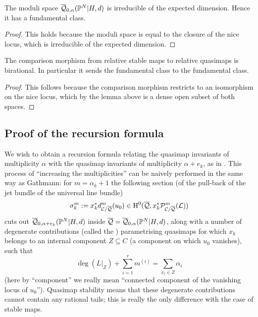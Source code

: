 \begin{cor} The moduli space $\overline{\mathcal Q}_{0,\alpha}(\mathbb P^N|H,d)$ is irreducible of the expected dimension. Hence it has a fundamental class. \end{cor}
\begin{proof} This holds because the moduli space is equal to the closure of the nice locus, which is irreducible of the expected dimension. \end{proof}

\begin{cor} \label{Comparison morphism birational} The comparison morphism from relative stable maps to relative quasimaps is birational. In particular it sends the fundamental class to the fundamental class. \end{cor}
\begin{proof} This follows because the comparison morphism restricts to an isomorphism on the nice locus, which by the lemma above is a dense open subset of both spaces. \end{proof}


\subsection{Proof of the recursion formula} \label{Subsection recursion formula for PN}
We wish to obtain a recursion formula relating the quasimap invariants of multiplicity $\alpha$ with the quasimap invariants of multiplicity $\alpha + e_k$, as in \cite[Theorem 2.6]{Ga}. This process of ``increasing the multiplicities'' can be naively performed in the same way as Gathmann: for $m = \alpha_k + 1$ the following section (of the pull-back of the jet bundle of the universal line bundle)
\[
\sigma^m_k := x_k^*d^m_{\mathcal C/\overline{\mathcal{Q}}}(u_0)\in \operatorname{H}^0(\overline{\mathcal{Q}},x_k^*\mathcal P^m_{\mathcal C/\overline{\mathcal Q}}(\mathcal L))
\]
cuts out $\overline{\mathcal Q}_{0,\alpha+e_k}(\mathbb P^N|H,d)$ inside $\overline{\mathcal{Q}} = \overline{\mathcal Q}_{0,\alpha}(\mathbb P^N|H,d)$, along with a number of degenerate contributions (called the ) parametrising quasimaps for which $x_k$ belongs to an internal component $Z \subseteq C$ (a component on which $u_0$ vanishes), such that
\begin{equation*}\deg(L|_{Z})+\sum_{i=1}^r m^{(i)}=\sum_{x_i\in Z}\alpha_i \end{equation*}
(here by ``component'' we really mean ``connected component of the vanishing locus of $u_0$''). Quasimap stability means that these degenerate contributions cannot contain any rational tails; this is really the only difference with the case of stable maps.

